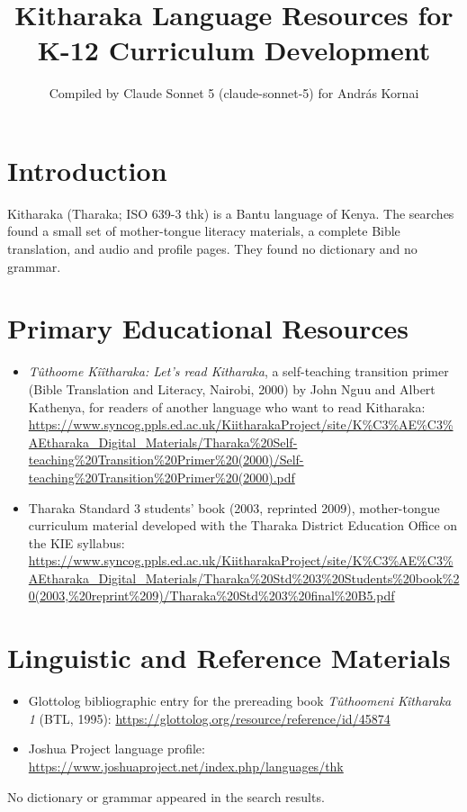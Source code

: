 \documentclass[12pt]{article}
\title{Kitharaka Language Resources for K-12 Curriculum Development}
\author{Compiled by Claude Sonnet 5 (claude-sonnet-5) for Andr\'as Kornai}
\date{}
\begin{document}
\maketitle

\section{Introduction}
Kitharaka (Tharaka; ISO 639-3 thk) is a Bantu language of Kenya. The searches found a small set of mother-tongue literacy materials, a complete Bible translation, and audio and profile pages. They found no dictionary and no grammar.

\section{Primary Educational Resources}
\begin{itemize}
\item \emph{T\^uthoome K\^i\^itharaka: Let's read Kitharaka}, a self-teaching transition primer (Bible Translation and Literacy, Nairobi, 2000) by John Nguu and Albert Kathenya, for readers of another language who want to read Kitharaka: \url{https://www.syncog.ppls.ed.ac.uk/KiitharakaProject/site/K%C3%AE%C3%AEtharaka_Digital_Materials/Tharaka%20Self-teaching%20Transition%20Primer%20(2000)/Self-teaching%20Transition%20Primer%20(2000).pdf}
\item Tharaka Standard 3 students' book (2003, reprinted 2009), mother-tongue curriculum material developed with the Tharaka District Education Office on the KIE syllabus: \url{https://www.syncog.ppls.ed.ac.uk/KiitharakaProject/site/K%C3%AE%C3%AEtharaka_Digital_Materials/Tharaka%20Std%203%20Students%20book%20(2003,%20reprint%209)/Tharaka%20Std%203%20final%20B5.pdf}
\end{itemize}

\section{Linguistic and Reference Materials}
\begin{itemize}
\item Glottolog bibliographic entry for the prereading book \emph{T\^uthoomeni K\^itharaka 1} (BTL, 1995): \url{https://glottolog.org/resource/reference/id/45874}
\item Joshua Project language profile: \url{https://www.joshuaproject.net/index.php/languages/thk}
\end{itemize}
No dictionary or grammar appeared in the search results.
\end{document}
